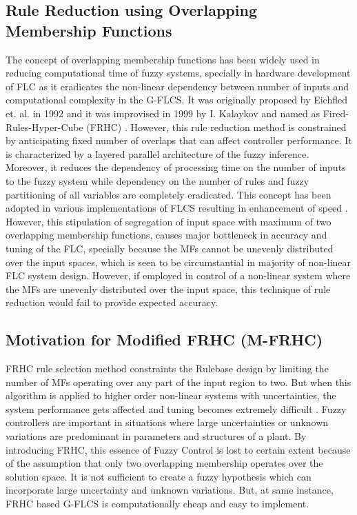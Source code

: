 \subsection{Rule Reduction using Overlapping Membership Functions}
The concept of overlapping membership functions has been widely used in reducing computational time of fuzzy systems, specially in hardware development of FLC as it eradicates the non-linear dependency between number of inputs and computational complexity in the G\hyp{}FLCS. It was originally proposed by Eichfled et. al. in 1992 \cite{Eichfeld1992} and it was improvised in 1999 by I. Kalaykov and named as Fired-Rules-Hyper-Cube (FRHC) \cite{Kalaykov1999}. However, this rule reduction method is constrained by anticipating fixed number of overlaps that can affect controller performance. It is characterized by a layered parallel architecture of the fuzzy inference. Moreover, it reduces the dependency of processing time on the number of inputs to the fuzzy system while dependency on the number of rules and fuzzy partitioning of all variables are completely eradicated. This concept has been adopted in various implementations of FLCS resulting in enhancement of speed \cite{Razib2013,Munoz-Salinas2008,Alcala2006,Sanz2011}.  However, this stipulation of segregation of input space with maximum of two overlapping membership functions, causes major bottleneck in accuracy and tuning of the FLC, specially because the MFs cannot be unevenly distributed over the input spaces, which is seen to be circumstantial in majority of non-linear FLC system design. However, if employed in control of a non-linear system where the MFs are unevenly distributed over the input space, this technique of rule reduction would fail to provide expected accuracy.

\subsection{Motivation for Modified FRHC (M-FRHC)} \label{sec:RLB:MFRHC}
FRHC rule selection method constraints the Rulebase design by limiting the number of MFs operating over any part of the input region to two. But when this algorithm is applied to higher order non-linear systems with uncertainties, the system performance gets affected and tuning becomes extremely difficult \cite{Alcala2006a,Alcala2006}. Fuzzy controllers are important in situations where large uncertainties or unknown variations are predominant in parameters and structures of a plant. By introducing FRHC, this essence of Fuzzy Control is lost to certain extent because of the assumption that only two overlapping membership operates over the solution space. It is not sufficient to create a fuzzy hypothesis which can incorporate large uncertainty and unknown variations. But, at same instance, FRHC based G-FLCS is computationally cheap and easy to implement.

